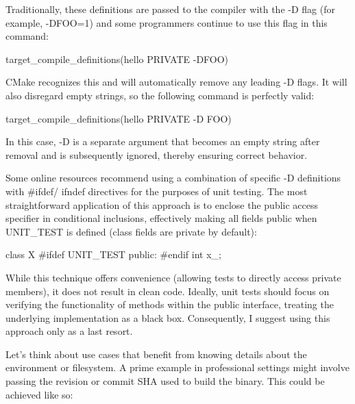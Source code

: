 Traditionally, these definitions are passed to the compiler with the -D flag (for example, -DFOO=1) and some programmers continue to use this flag in this command:

\begin{cmake}
target_compile_definitions(hello PRIVATE -DFOO)
\end{cmake}

CMake recognizes this and will automatically remove any leading -D flags. It will also disregard empty strings, so the following command is perfectly valid:

\begin{cmake}
target_compile_definitions(hello PRIVATE -D FOO)
\end{cmake}

In this case, -D is a separate argument that becomes an empty string after removal and is subsequently ignored, thereby ensuring correct behavior.


Some online resources recommend using a combination of specific -D definitions with \#ifdef/ ifndef directives for the purposes of unit testing. The most straightforward application of this approach is to enclose the public access specifier in conditional inclusions, effectively making all fields public when UNIT\_TEST is defined (class fields are private by default):

\begin{cpp}
class X {
#ifdef UNIT_TEST
    public:
#endif
    int x_;
}
\end{cpp}

While this technique offers convenience (allowing tests to directly access private members), it does not result in clean code. Ideally, unit tests should focus on verifying the functionality of methods within the public interface, treating the underlying implementation as a black box. Consequently, I suggest using this approach only as a last resort.


Let’s think about use cases that benefit from knowing details about the environment or filesystem. A prime example in professional settings might involve passing the revision or commit SHA used to build the binary. This could be achieved like so:



